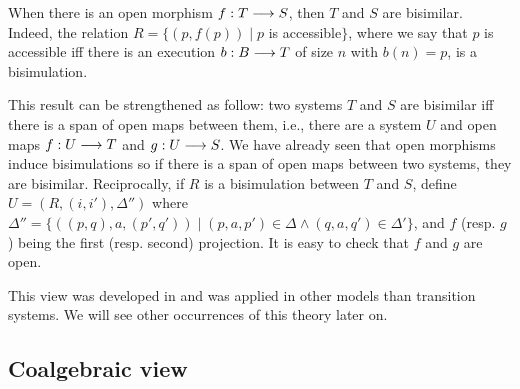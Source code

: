 		 When there is an open morphism $f : T \longrightarrow S$, then $T$ and $S$ are bisimilar. Indeed, the relation $R = \{(p,f(p)) \mid p$ is accessible$\}$, where we say that $p$ is accessible iff there is an execution $b : B \longrightarrow T$ of size $n$ with $b(n) = p$, is a bisimulation.
		 
		 This result can be strengthened as follow: two systems $T$ and $S$ are bisimilar iff there is a span of open maps between them, i.e., there are a system $U$ and open maps $f : U \longrightarrow T$ and $g : U \longrightarrow S$. We have already seen that open morphisms induce bisimulations so if there is a span of open maps between two systems, they are bisimilar. Reciprocally, if $R$ is a bisimulation between $T$ and $S$, define $U = (R,(i,i'),\Delta'')$ where $\Delta'' = \{((p,q),a,(p',q')) \mid (p,a,p') \in \Delta \wedge (q,a,q') \in \Delta'\}$, and $f$ (resp. $g$) being the first (resp. second) projection. It is easy to check that $f$ and $g$ are open.
		 
		 This view was developed in \cite{joyal96} and was applied in other models than transition systems. We will see other occurrences of this theory later on.
		 
		 
		 \subsection{Coalgebraic view}
		 
